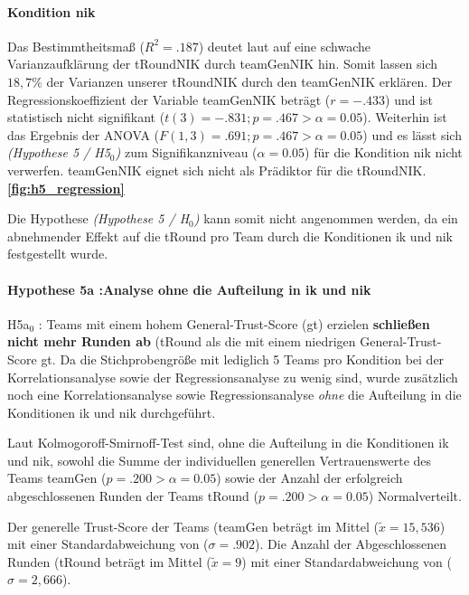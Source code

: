 \documentclass[a4paper,11pt]{article}%
\renewcommand{\\}{\vspace*{0.5\baselineskip} \newline}
\begin{document}
\paragraph{Kondition \ac{nik}}
Das Bestimmtheitsmaß ($R^{2} = .187$) deutet laut \citep{cohen2013statistical} auf eine schwache Varianzaufklärung der \ac{tRoundNIK} durch \ac{teamGenNIK} hin. Somit lassen sich $18,7\%$ der Varianzen unserer \ac{tRoundNIK} durch den \ac{teamGenNIK} erklären. \\
Der Regressionskoeffizient der Variable \ac{teamGenNIK} beträgt ($r = -.433$) und ist statistisch nicht signifikant ($t(3) = -.831; p = .467 > \alpha = 0.05$). \\
Weiterhin ist das Ergebnis der ANOVA ($F(1,3) = .691; p = .467 > \alpha = 0.05$) und es lässt sich \textit{(Hypothese 5 / H5$_{0}$)} zum Signifikanzniveau ($\alpha = 0.05$) für die Kondition \ac{nik} nicht verwerfen. \\
\ac{teamGenNIK} eignet sich nicht als Prädiktor für die \ac{tRoundNIK}.\\
\textbf{\autoref{fig:h5_regression}}

Die Hypothese \textit{(Hypothese 5 / H$_{0}$)} kann somit nicht angenommen werden, da ein abnehmender Effekt auf die \ac{tRound} pro Team durch die Konditionen \ac{ik} und \ac{nik} festgestellt wurde.

\paragraph{Hypothese 5a :Analyse ohne die Aufteilung in \ac{ik} und \ac{nik}}
H5a$_{0}$ : Teams mit einem hohem General-Trust-Score (\ac{gt}) erzielen \textbf{schließen nicht mehr Runden ab} (\ac{tRound} als die mit einem niedrigen General-Trust-Score \ac{gt}.\\
Da die Stichprobengröße mit lediglich 5 Teams pro Kondition bei der Korrelationsanalyse sowie der Regressionsanalyse zu wenig sind, wurde zusätzlich noch eine Korrelationsanalyse sowie Regressionsanalyse \textit{ohne} die Aufteilung in die Konditionen \ac{ik} und \ac{nik} durchgeführt.

Laut Kolmogoroff-Smirnoff-Test sind, ohne die Aufteilung in die Konditionen \ac{ik} und \ac{nik}, sowohl die Summe der individuellen generellen Vertrauenswerte des Teams \ac{teamGen} ($p = .200 > \alpha = 0.05$) sowie der Anzahl der erfolgreich abgeschlossenen Runden der Teams \ac{tRound} ($p = .200 > \alpha = 0.05$) Normalverteilt.

Der generelle Trust-Score der Teams (\ac{teamGen} beträgt im Mittel ($\tilde x = 15,536$) mit einer Standardabweichung von ($\sigma = .902$).
Die Anzahl der Abgeschlossenen Runden (\ac{tRound} beträgt im Mittel ($\tilde x = 9$) mit einer Standardabweichung von ($\sigma = 2,666$). 
\end{document}
